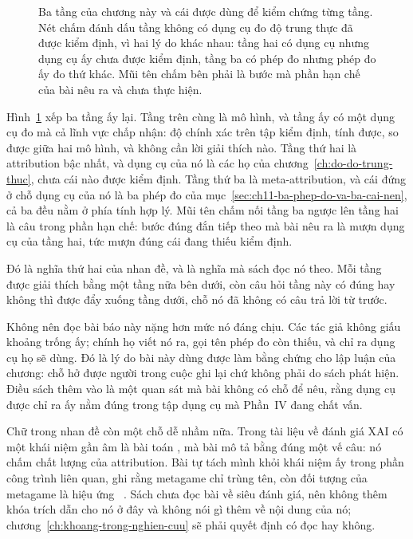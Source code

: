 \begin{figure}[tbp]
  \centering
  
  \caption{Ba tầng của chương này và cái được dùng để kiểm chứng từng tầng. Nét
  chấm đánh dấu tầng không có dụng cụ đo độ trung thực đã được kiểm định, vì hai
  lý do khác nhau: tầng hai có dụng cụ nhưng dụng cụ ấy chưa được kiểm định,
  tầng ba có phép đo nhưng phép đo ấy đo thứ khác. Mũi tên chấm bên phải là
  bước mà phần hạn chế của bài nêu ra và chưa thực hiện.}
  \label{fig:ch11-ba-tang}
\end{figure}

Hình~\ref{fig:ch11-ba-tang} xếp ba tầng ấy lại. Tầng trên cùng là mô hình, và
tầng ấy có một dụng cụ đo mà cả lĩnh vực chấp nhận: độ chính xác trên tập kiểm
định, tính được, so được giữa hai mô hình, và không cần lời giải thích nào. Tầng
thứ hai là attribution bậc nhất, và dụng cụ của nó là các họ 
của chương~\ref{ch:do-do-trung-thuc}, chưa cái nào được kiểm định. Tầng thứ ba
là meta-attribution, và cái đứng ở chỗ dụng cụ của nó là ba phép đo của
mục~\ref{sec:ch11-ba-phep-do-va-ba-cai-nen}, cả ba đều nằm ở phía tính hợp lý.
Mũi tên chấm nối tầng ba ngược lên tầng hai là câu trong phần hạn chế: bước
đúng đắn tiếp theo mà bài nêu ra là mượn dụng cụ của tầng hai, tức mượn đúng
cái đang thiếu kiểm định.

Đó là nghĩa thứ hai của nhan đề, và là nghĩa mà sách đọc nó theo. Mỗi tầng được
giải thích bằng một tầng nữa bên dưới, còn câu hỏi tầng này có đúng hay không
thì được đẩy xuống tầng dưới, chỗ nó đã không có câu trả lời từ trước.

Không nên đọc bài báo này nặng hơn mức nó đáng chịu. Các tác giả không giấu
khoảng trống ấy; chính họ viết nó ra, gọi tên phép đo còn thiếu, và chỉ ra dụng
cụ họ sẽ dùng. Đó là lý do bài này dùng được làm bằng chứng cho
lập luận của chương: chỗ hở được người trong cuộc ghi lại chứ không phải do
sách phát hiện. Điều sách thêm vào là một quan sát mà bài không có chỗ để nêu,
rằng dụng cụ được chỉ ra ấy nằm đúng trong tập dụng cụ mà Phần~IV đang chất
vấn.

Chữ trong nhan đề còn một chỗ dễ nhầm nữa. Trong tài liệu về đánh giá XAI có
một khái niệm gần âm là bài toán , mà bài mô
tả bằng đúng một vế
câu: nó chấm chất lượng của attribution. Bài tự tách mình khỏi khái niệm ấy
trong phần công trình liên quan, ghi rằng metagame chỉ trùng tên, còn đối tượng
của metagame là hiệu ứng ~\autocite{p23metagame}.
Sách chưa đọc bài về siêu đánh giá, nên không thêm khóa trích dẫn cho nó ở đây
và không nói gì thêm về nội dung của nó;
chương~\ref{ch:khoang-trong-nghien-cuu} sẽ phải quyết định có đọc hay không.
%
